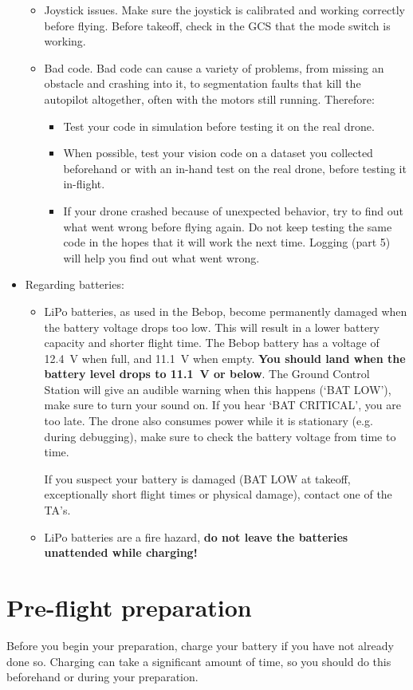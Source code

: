 \documentclass{article}
\begin{document}
\begin{itemize}
\begin{itemize}
\item Joystick issues. Make sure the joystick is calibrated and working correctly before flying. Before takeoff, check in the GCS that the mode switch is working.
\item Bad code. Bad code can cause a variety of problems, from missing an obstacle and crashing into it, to segmentation faults that kill the autopilot altogether, often with the motors still running. Therefore:
\begin{itemize}
\item Test your code in simulation before testing it on the real drone.
\item When possible, test your vision code on a dataset you collected beforehand or with an in-hand test on the real drone, before testing it in-flight.
\item If your drone crashed because of unexpected behavior, try to find out what went wrong before flying again. Do not keep testing the same code in the hopes that it will work the next time. Logging (part 5) will help you find out what went wrong.
\end{itemize}
\end{itemize}
\item Regarding batteries:
\begin{itemize}
\item{LiPo batteries, as used in the Bebop, become permanently damaged when the battery voltage drops too low. This will result in a lower battery capacity and shorter flight time. The Bebop battery has a voltage of 12.4~V when full, and 11.1~V when empty. \textbf{You should land when the battery level drops to 11.1~V or below}. The Ground Control Station will give an audible warning when this happens (`BAT LOW'), make sure to turn your sound on. If you hear `BAT CRITICAL', you are too late. The drone also consumes power while it is stationary (e.g. during debugging), make sure to check the battery voltage from time to time.

If you suspect your battery is damaged (BAT LOW at takeoff, exceptionally short flight times or physical damage), contact one of the TA's.}

\item{LiPo batteries are a fire hazard, \textbf{do not leave the batteries unattended while charging!}}
\end{itemize}
\end{itemize}




\section{Pre-flight preparation}
Before you begin your preparation, charge your battery if you have not already done so. Charging can take a significant amount of time, so you should do this beforehand or during your preparation.
\end{document}
